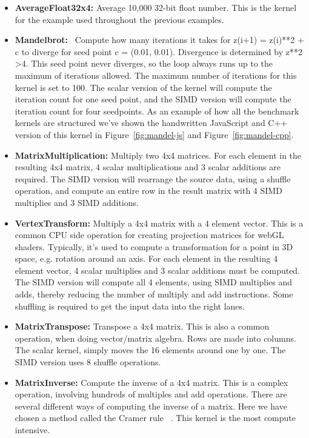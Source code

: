 \documentclass[preprint]{sigplanconf}
\begin{document}
\begin{itemize}
\item
\textbf{AverageFloat32x4:} Average 10,000 32-bit float number.  This 
is the kernel for the example used throughout the previous examples.

\item
\textbf{Mandelbrot:}~\cite{mandelbrot} Compute how many iterations it takes for
z(i+1) = z(i)**2 + c to diverge for seed point c = (0.01, 0.01).
Divergence is determined by z**2 \textgreater 4. This seed point never diverges, so
the loop always runs up to the maximum of iterations allowed.  The
maximum number of iterations for this kernel is set to 100.  The scalar version
of the kernel will compute the iteration count for one seed point, and
the SIMD version will compute the iteration count for four seedpoints.
As an example of how all the benchmark kernels are structured we've shown
the handwritten JavaScript and C++ version of this kernel in Figure~\ref{fig:mandel-js}
and Figure~\ref{fig:mandel-cpp}.

\item
\textbf{MatrixMultiplication:} Multiply two 4x4 matrices.  For each element in
the resulting 4x4 matrix, 4 scalar multiplications and 3 scalar additions are
required.  The SIMD version will rearrange the source data, using a shuffle operation,
and compute an entire row in the result matrix with 4 SIMD multiplies and 3 SIMD additions.

\item
\textbf{VertexTransform:} Multiply a 4x4 matrix with a 4 element vector.  This
is a common CPU side operation for creating projection matrices for webGL shaders.
Typically, it's used to compute a transformation for a point in 3D space, e.g. rotation
around an axis.  For each element in the resulting 4 element vector, 4 scalar multiplies
and 3 scalar additions must be computed.  The SIMD version will compute all 4 elements,
using SIMD multiplies and adds, thereby reducing the number of multiply and add instructions.
Some shuffling is required to get the input data into the right lanes.

\item
\textbf{MatrixTranspose:} Transpose a 4x4 matrix.  This is also a common operation, when
doing vector/matrix algebra.  Rows are made into columns.  The scalar kernel, simply moves
the 16 elements around one by one.  The SIMD version uses 8 shuffle operations.

\item
\textbf{MatrixInverse:} Compute the inverse of a 4x4 matrix.  This is a complex operation,
involving hundreds of multiples and add operations.  There are several different ways
of computing the inverse of a matrix.  Here we have chosen a method called the Cramer rule
~\cite{cramer-rule}.  This kernel is the most compute intensive.

\end{itemize}
\end{document}
